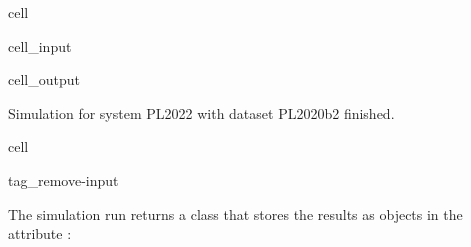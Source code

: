 \documentclass[letterpaper,10pt,english]{sphinxmanual}
\begin{document}
\begin{sphinxuseclass}{cell}
\begin{sphinxuseclass}{cell_input}
\begin{sphinxVerbatim}[commandchars=\\\{\}]
\PYG{p}{[}\PYG{p}{]}\PYG{p}{[}\PYG{p}{]}
\end{sphinxVerbatim}

\end{sphinxuseclass}
\begin{sphinxuseclass}{cell_output}
\begin{sphinxVerbatim}[commandchars=\\\{\}]
Simulation for system PL\PYGZus{}2022 with dataset PL\PYGZus{}2020\PYGZus{}b2 finished.
\end{sphinxVerbatim}

\end{sphinxuseclass}
\end{sphinxuseclass}
\begin{sphinxuseclass}{cell}
\begin{sphinxuseclass}{tag_remove-input}
\end{sphinxuseclass}
\end{sphinxuseclass}
\sphinxAtStartPar
The simulation run returns a  class that stores the results as  objects in the attribute :
\end{document}
